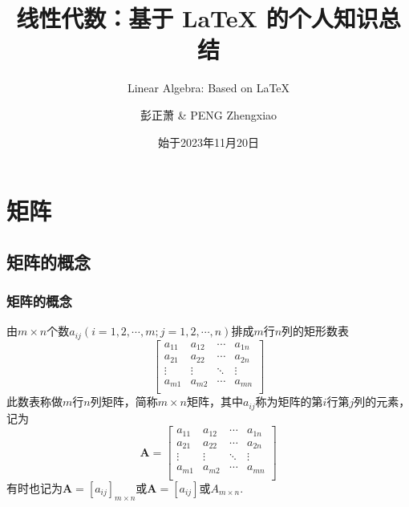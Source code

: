 \documentclass[lang=cn,10pt]{elegantbook}
\title{线性代数：基于 \LaTeX{} 的个人知识总结}
\subtitle{Linear Algebra: Based on \LaTeX{} }
\author{彭正萧 \& PENG Zhengxiao}
\institute{西北农林科技大学}
\date{始于2023年11月20日}
\newcommand{\matA}{\mathbf{A}}
\begin{document}
\maketitle
\frontmatter

\tableofcontents

\mainmatter

\chapter{矩阵}

	\section{矩阵的概念}
	\subsection{矩阵的概念}
	\begin{definition}
		由\( m \times n \)个数\( a_{ij} (i = 1, 2, \cdots, m; j = 1, 2, \cdots, n) \)排成\( m \)行\( n \)列的矩形数表
		\[
			\begin{bmatrix}
				a_{11} & a_{12} & \cdots & a_{1n} \\
				a_{21} & a_{22} & \cdots & a_{2n} \\
				\vdots & \vdots & \ddots & \vdots \\
				a_{m1} & a_{m2} & \cdots & a_{mn} \\
			\end{bmatrix}
		\]
		此数表称做\( m \)行\( n \)列{\heiti 矩阵}，简称\( m \times n \){\heiti 矩阵}，其中\( a_{ij} \)称为矩阵的第\( i \)行第\( j \)列的{\heiti 元素}，记为
		\[
			\matA = 
			\begin{bmatrix}
				a_{11} & a_{12} & \cdots & a_{1n} \\
				a_{21} & a_{22} & \cdots & a_{2n} \\
				\vdots & \vdots & \ddots & \vdots \\
				a_{m1} & a_{m2} & \cdots & a_{mn} \\
			\end{bmatrix}
		\]
		有时也记为\( \matA = [a_{ij}]_{m \times n} \)或\( \matA = [a_{ij}] \)或\( A_{m \times n} \).
	\end{definition}
	
\end{document}

